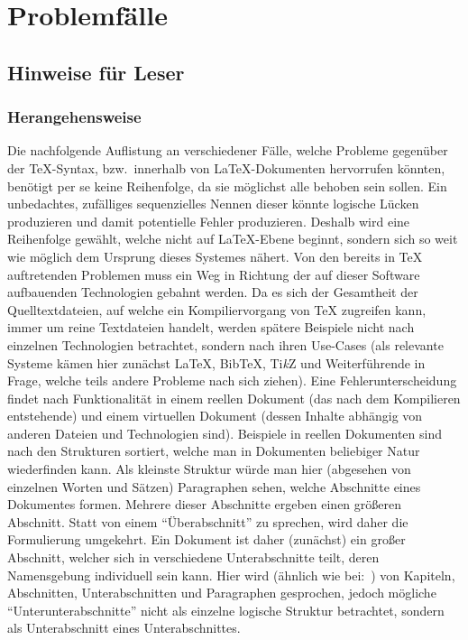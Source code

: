 \section{Problemfälle}
\subsection{Hinweise für Leser}
\subsubsection*{Herangehensweise}
Die nachfolgende Auflistung an verschiedener Fälle, welche Probleme gegenüber der \TeX{}-Syntax, bzw.\ innerhalb von \LaTeX{}-Dokumenten hervorrufen könnten, benötigt per se keine Reihenfolge, da sie möglichst alle behoben sein sollen. Ein unbedachtes, zufälliges sequenzielles Nennen dieser könnte logische Lücken produzieren und damit potentielle Fehler produzieren. 
Deshalb wird eine Reihenfolge gewählt, welche nicht auf \LaTeX{}-Ebene beginnt, sondern sich so weit wie möglich dem Ursprung dieses Systemes nähert.
Von den bereits in \TeX{} auftretenden Problemen muss ein Weg in Richtung der auf dieser Software aufbauenden Technologien gebahnt werden. Da es sich der Gesamtheit der Quelltextdateien, auf welche ein Kompiliervorgang von \TeX{} zugreifen kann, immer um reine Textdateien handelt, werden spätere Beispiele nicht nach einzelnen Technologien betrachtet, sondern nach ihren Use-Cases (als relevante Systeme kämen hier zunächst \LaTeX{}, Bib\TeX{}, Ti\textit{k}Z und Weiterführende in Frage, welche teils andere Probleme nach sich ziehen).%
Eine Fehlerunterscheidung findet nach Funktionalität in einem reellen Dokument (das nach dem Kompilieren entstehende) und einem virtuellen Dokument (dessen Inhalte abhängig von anderen Dateien und Technologien sind). 
Beispiele in reellen Dokumenten sind nach den Strukturen sortiert, welche man in Dokumenten beliebiger Natur wiederfinden kann. Als kleinste Struktur würde man hier (abgesehen von einzelnen Worten und Sätzen) Paragraphen sehen, welche Abschnitte eines Dokumentes formen. Mehrere dieser Abschnitte ergeben einen größeren Abschnitt. Statt von einem \enquote{Überabschnitt} zu sprechen, wird daher die Formulierung umgekehrt. Ein Dokument ist daher (zunächst) ein großer Abschnitt, welcher sich in verschiedene Unterabschnitte teilt, deren Namensgebung individuell sein kann. Hier wird (ähnlich wie bei:~\cite{texbook}) von Kapiteln, Abschnitten, Unterabschnitten und Paragraphen gesprochen, jedoch mögliche \enquote{Unterunterabschnitte} nicht als einzelne logische Struktur betrachtet, sondern als Unterabschnitt eines Unterabschnittes. 
